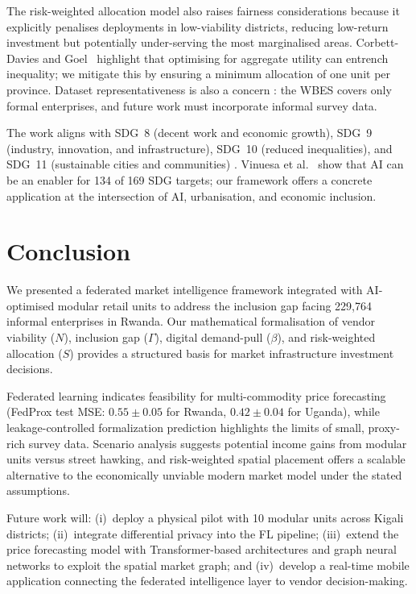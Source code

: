 \documentclass{article}
\begin{document}
The risk-weighted allocation model also raises fairness considerations because it explicitly penalises deployments in low-viability districts, reducing low-return investment but potentially under-serving the most marginalised areas.
Corbett-Davies and Goel~ highlight that optimising for aggregate utility can entrench inequality; we mitigate this by ensuring a minimum allocation of one unit per province.
Dataset representativeness is also a concern \cite{scheuerman2021datasets}: the WBES covers only formal enterprises, and future work must incorporate informal survey data.

The work aligns with SDG~8 (decent work and economic growth), SDG~9 (industry, innovation, and infrastructure), SDG~10 (reduced inequalities), and SDG~11 (sustainable cities and communities) \cite{un2015sdg}.
Vinuesa et al.~ show that AI can be an enabler for 134 of 169 SDG targets; our framework offers a concrete application at the intersection of AI, urbanisation, and economic inclusion.

\section{Conclusion}
\label{sec:conclusion}

We presented a federated market intelligence framework integrated with AI-optimised modular retail units to address the inclusion gap facing 229,764 informal enterprises in Rwanda.
Our mathematical formalisation of vendor viability ($N$), inclusion gap ($\Gamma$), digital demand-pull ($\beta$), and risk-weighted allocation ($S$) provides a structured basis for market infrastructure investment decisions.

Federated learning indicates feasibility for multi-commodity price forecasting (FedProx test MSE: $0.55\pm0.05$ for Rwanda, $0.42\pm0.04$ for Uganda), while leakage-controlled formalization prediction highlights the limits of small, proxy-rich survey data.
Scenario analysis suggests potential income gains from modular units versus street hawking, and risk-weighted spatial placement offers a scalable alternative to the economically unviable modern market model under the stated assumptions.

Future work will: (i)~deploy a physical pilot with 10 modular units across Kigali districts; (ii)~integrate differential privacy \cite{wei2022dpfl} into the FL pipeline; (iii)~extend the price forecasting model with Transformer-based architectures \cite{zhou2021informer,wu2023timesnet} and graph neural networks \cite{wu2021graphsurvey} to exploit the spatial market graph; and (iv)~develop a real-time mobile application connecting the federated intelligence layer to vendor decision-making.
\end{document}
